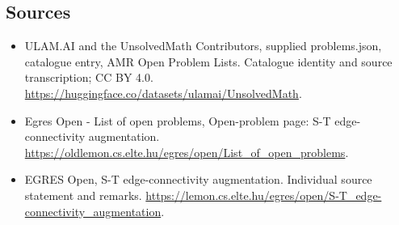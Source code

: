 \documentclass[11pt,a4paper]{article}
\begin{document}
\subsection{Sources}
\begin{itemize}
\item[S1] ULAM.AI and the UnsolvedMath Contributors, supplied problems.json, catalogue entry, AMR Open Problem Lists. Catalogue identity and source transcription; CC BY 4.0.
\url{https://huggingface.co/datasets/ulamai/UnsolvedMath}.
\item[S2] Egres Open - List of open problems, Open-problem page: S-T edge-connectivity augmentation. 
\url{https://oldlemon.cs.elte.hu/egres/open/List_of_open_problems}.
\item[S3] EGRES Open, S-T edge-connectivity augmentation. Individual source statement and remarks.
\url{https://lemon.cs.elte.hu/egres/open/S-T_edge-connectivity_augmentation}.
\end{itemize}
\end{document}
